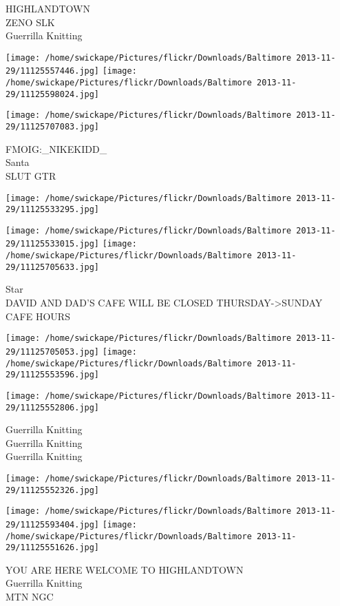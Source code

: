 \documentclass[10pt,letterpaper]{article}
\begin{document}
HIGHLANDTOWN\\
ZENO SLK\\
Guerrilla Knitting
\pagebreak

\texttt{[image: /home/swickape/Pictures/flickr/Downloads/Baltimore 2013-11-29/11125557446.jpg]}
\texttt{[image: /home/swickape/Pictures/flickr/Downloads/Baltimore 2013-11-29/11125598024.jpg]}

\texttt{[image: /home/swickape/Pictures/flickr/Downloads/Baltimore 2013-11-29/11125707083.jpg]}

FMOIG:\_NIKEKIDD\_\\
Santa\\
SLUT GTR
\pagebreak

\texttt{[image: /home/swickape/Pictures/flickr/Downloads/Baltimore 2013-11-29/11125533295.jpg]}

\vspace{0.25in}
\texttt{[image: /home/swickape/Pictures/flickr/Downloads/Baltimore 2013-11-29/11125533015.jpg]}
\texttt{[image: /home/swickape/Pictures/flickr/Downloads/Baltimore 2013-11-29/11125705633.jpg]}

Star\\
DAVID AND DAD'S CAFE WILL BE CLOSED THURSDAY{-}>SUNDAY\\
CAFE HOURS
\pagebreak

\texttt{[image: /home/swickape/Pictures/flickr/Downloads/Baltimore 2013-11-29/11125705053.jpg]}
\texttt{[image: /home/swickape/Pictures/flickr/Downloads/Baltimore 2013-11-29/11125553596.jpg]}

\texttt{[image: /home/swickape/Pictures/flickr/Downloads/Baltimore 2013-11-29/11125552806.jpg]}

Guerrilla Knitting\\
Guerrilla Knitting\\
Guerrilla Knitting
\pagebreak

\texttt{[image: /home/swickape/Pictures/flickr/Downloads/Baltimore 2013-11-29/11125552326.jpg]}

\vspace{0.25in}
\texttt{[image: /home/swickape/Pictures/flickr/Downloads/Baltimore 2013-11-29/11125593404.jpg]}
\texttt{[image: /home/swickape/Pictures/flickr/Downloads/Baltimore 2013-11-29/11125551626.jpg]}

YOU ARE HERE WELCOME TO HIGHLANDTOWN\\
Guerrilla Knitting\\
MTN NGC
\pagebreak
\end{document}
